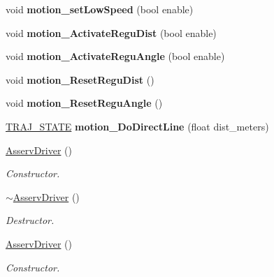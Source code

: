 \begin{DoxyCompactItemize}
void {\bfseries motion\+\_\+set\+Low\+Speed} (bool enable)
\item 
\mbox{\label{classAsservDriver_a48e4f69bf857d6a18098dc48615a61f1}} 
void {\bfseries motion\+\_\+\+Activate\+Regu\+Dist} (bool enable)
\item 
\mbox{\label{classAsservDriver_a846608b8033f7d592d2540b68de72eeb}} 
void {\bfseries motion\+\_\+\+Activate\+Regu\+Angle} (bool enable)
\item 
\mbox{\label{classAsservDriver_acb84d282c7e0b40d9b326b0fcb7a0c69}} 
void {\bfseries motion\+\_\+\+Reset\+Regu\+Dist} ()
\item 
\mbox{\label{classAsservDriver_acd102376cacdf0fc40a587f25359a25e}} 
void {\bfseries motion\+\_\+\+Reset\+Regu\+Angle} ()
\item 
\mbox{\label{classAsservDriver_a27f3a8fa56cc689d072a39efb1ed20b3}} 
\hyperlink{path__manager_8h_adb3360abeb29758da93865c8afcb80eb}{T\+R\+A\+J\+\_\+\+S\+T\+A\+TE} {\bfseries motion\+\_\+\+Do\+Direct\+Line} (float dist\+\_\+meters)
\item 
\mbox{\label{classAsservDriver_a70982198e21af96e5d4faa6ce9b0608c}} 
\hyperlink{classAsservDriver_a70982198e21af96e5d4faa6ce9b0608c}{Asserv\+Driver} ()
\begin{DoxyCompactList}\small\item\em Constructor. \end{DoxyCompactList}\item 
\mbox{\label{classAsservDriver_a5960b3ced1e727d33ded6ff469fc1a78}} 
\hyperlink{classAsservDriver_a5960b3ced1e727d33ded6ff469fc1a78}{$\sim$\+Asserv\+Driver} ()
\begin{DoxyCompactList}\small\item\em Destructor. \end{DoxyCompactList}\item 
\mbox{\label{classAsservDriver_a70982198e21af96e5d4faa6ce9b0608c}} 
\hyperlink{classAsservDriver_a70982198e21af96e5d4faa6ce9b0608c}{Asserv\+Driver} ()
\begin{DoxyCompactList}\small\item\em Constructor. \end{DoxyCompactList}\item 

\end{DoxyCompactItemize}
